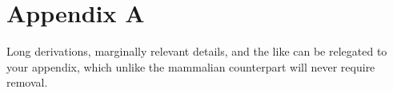 \documentclass[../main]{subfiles}
\begin{document}
\chapter*{Appendix A}

Long derivations, marginally relevant details, and the like can be relegated to your appendix, which unlike the mammalian counterpart will never require removal.
\end{document}
